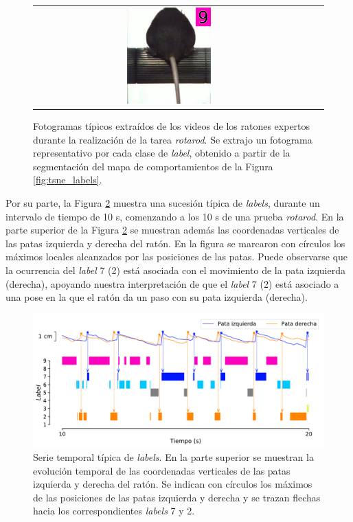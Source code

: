 \begin{figure}[!htbp]
\begin{tabular}{ccc}
\includegraphics[width=0.32\textwidth]{figuras/expertos/videos/9.pdf}
\end{tabular}
\caption{Fotogramas típicos extraídos de los videos de los ratones expertos durante la realización de la tarea \textit{rotarod}. Se extrajo un fotograma representativo por cada clase de \textit{label}, obtenido a partir de la segmentación del mapa de comportamientos de la Figura \ref{fig:tsne_labels}.}
\label{fig:poses}
\end{figure}

Por su parte, la Figura \ref{fig:label_evento_secuencia} muestra una sucesión típica de \textit{labels}, durante un intervalo de tiempo de 10 s, comenzando a los 10 s de una prueba \textit{rotarod}. En la parte superior de la Figura \ref{fig:label_evento_secuencia} se muestran además las coordenadas verticales de las patas izquierda y derecha del ratón. En la figura se marcaron con círculos los máximos locales alcanzados por las posiciones de las patas. Puede observarse que la ocurrencia del \textit{label} 7 (2) está asociada con el movimiento de la pata izquierda (derecha), apoyando nuestra interpretación de que el \textit{label} 7 (2) está asociado a una pose en la que el ratón da un paso con su pata izquierda (derecha).

\begin{figure}[!htbp]
    \centering
    \includegraphics[width=1\linewidth]{figuras/expertos/labels/event_blocks_positions.pdf}
    \caption{Serie temporal típica de \textit{labels}. En la parte superior se muestran la evolución temporal de las coordenadas verticales de las patas izquierda y derecha del ratón. Se indican con círculos los máximos de las posiciones de las patas izquierda y derecha y se trazan flechas hacia los correspondientes \textit{labels} 7 y 2.}
    \label{fig:label_evento_secuencia}
\end{figure}

